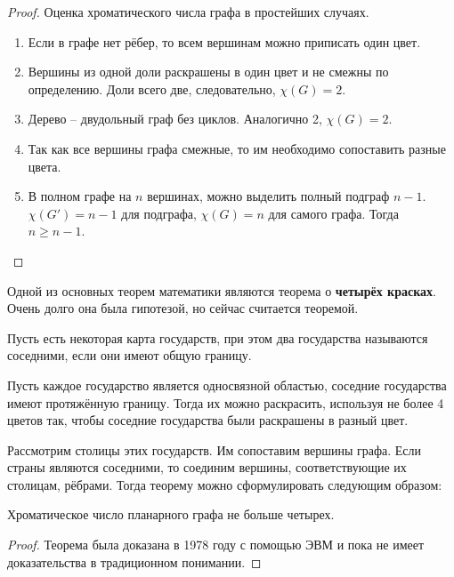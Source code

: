 \begin{proof}
    Оценка хроматического числа графа в простейших случаях.
    \begin{enumerate}[left=0.0em, labelsep=1em, topsep=0.0em, itemsep=0pt, parsep=0.5em]
        \item Если в графе нет рёбер, то всем вершинам можно приписать один цвет.
        \item Вершины из одной доли раскрашены в один цвет и не смежны по определению.
        Доли всего две, следовательно, $\chi(G)=2$.
        \item Дерево -- двудольный граф без циклов. Аналогично 2, $\chi(G)=2$.
        \item Так как все вершины графа смежные, то им необходимо сопоставить
        разные цвета.
        \item В полном графе на $n$ вершинах, можно выделить полный подграф
        $n-1$. $\chi({G}')=n-1$ для подграфа, $\chi(G)=n$ для самого графа. Тогда $n \geq n - 1$. 
    \end{enumerate}
\end{proof}

\newpage
Одной из основных теорем математики являются теорема о \textbf{четырёх красках}.
Очень долго она была гипотезой, но сейчас считается теоремой.

Пусть есть некоторая карта государств, при этом два государства называются
соседними, если они имеют общую границу.

\begin{theorem}
    Пусть каждое государство является односвязной областью, соседние
    государства имеют протяжённую границу. Тогда их можно раскрасить,
    используя не более 4 цветов так, чтобы соседние государства были
    раскрашены в разный цвет.

    Рассмотрим столицы этих государств. Им сопоставим вершины графа. Если
    страны являются соседними, то соединим вершины, соответствующие их
    столицам, рёбрами. Тогда теорему можно сформулировать следующим
    образом:
\end{theorem}

\begin{theorem}
    Хроматическое число планарного графа не больше четырех.
\end{theorem}

\begin{proof}
    Теорема была доказана в 1978 году с помощью ЭВМ и пока не имеет
    доказательства в традиционном понимании.
\end{proof}

